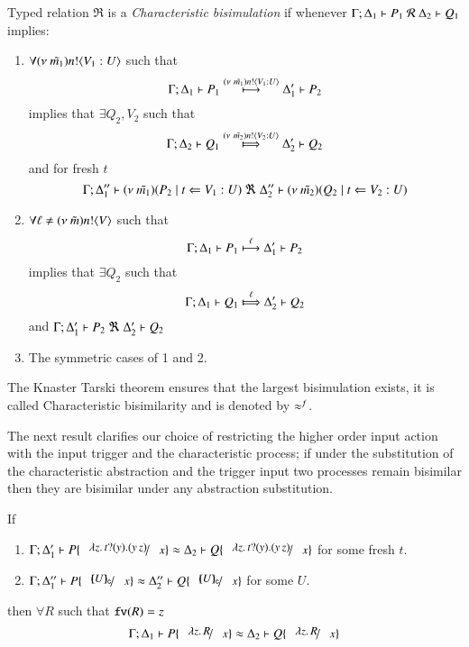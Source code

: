 \begin{definition}\rm
	\label{def:cbisim}
	Typed relation 
	$\Re$ is a {\em Characteristic bisimulation} if whenever
	$\horel{\Gamma}{\Delta_1}{P_1}{\ \mathcal{R}\ }{\Delta_2}{Q_1}$ implies:
	\begin{enumerate}
		\item	$\forall (\nu\ \tilde{m_1}) n ! \langle V_1: U \rangle$ such that %
			\[
				\Gamma; \Delta_1 \vdash P_1 \stackrel{(\nu\ \tilde{m_1}) n ! \langle V_1: U \rangle}{\longmapsto} \Delta_1' \vdash P_2
			\]
			implies that $\exists Q_2, V_2$ such that %
			\[
				\horel{\Gamma}{\Delta_2}{Q_1}{\Hby{\news{\tilde{m_2}} \bactout{n}{V_2: U}}}{\Delta_2'}{Q_2}
			\]
			and for fresh $t$
			\[
				\Gamma; \Delta_1'' \vdash (\nu\ \tilde{m_1})(P_2 \;|\; t \Leftarrow V_1:U) \ \Re\  \Delta_2'' \vdash{(\nu\ \tilde{m_2})(Q_2 \;|\;t \Leftarrow V_2:U)}
			\]
%
		\item	$\forall \ell \not= (\nu\ \tilde{m}) n ! \langle V \rangle$ such that
			\[
				\Gamma; \Delta_1 \vdash P_1 \stackrel{\ell}{\longmapsto} \Delta_1' \vdash P_2
			\]
			implies that $\exists Q_2$ such that 
			\[
				\horel{\Gamma}{\Delta_1}{Q_1}{\Hby{\ell}}{\Delta_2'}{Q_2}
			\]
			and
			$\horel{\Gamma}{\Delta_1'}{P_2}{\ \Re\ }{\Delta_2'}{Q_2}$

		\item	The symmetric cases of 1 and 2.
	\end{enumerate}
	The Knaster Tarski theorem ensures that the largest bisimulation exists,
	it is called Characteristic bisimilarity and is denoted by $\approx^{f}$.
\end{definition}

The next result clarifies our choice of restricting
the higher order input action with the input trigger and
the characteristic process; if under the substitution
of the characteristic abstraction and the trigger
input two processes remain bisimilar then they
are bisimilar under any abstraction substitution.

\begin{lemma}\rm
	\label{lem:proc_subst}
	If 
%
	\begin{enumerate}
		\item	$\horel{\Gamma}{\Delta_1'}{P \subst{\abs{z}{\binp{t}{y} (\appl{y}{z})}}{x}}{\wb}{\Delta_2}{Q \subst{\abs{z}{\binp{t}{y} (\appl{y}{z})}}{x}}$
			for some fresh $t$.

		\item	$\horel{\Gamma}{\Delta_1''}{P \subst{\omapchar{U}}{x}}{\wb}{\Delta_2''}{Q \subst{\omapchar{U}}{x}}$
			for some $U$.
	\end{enumerate}
%
	then $\forall R$ such that $\mathtt{fv}(R) = z$
\[
	\horel{\Gamma}{\Delta_1}{P \subst{\abs{z}{R}}{x}}{\wb}{\Delta_2}{Q \subst{\abs{z}{R}}{x}}
\]
\end{lemma}

